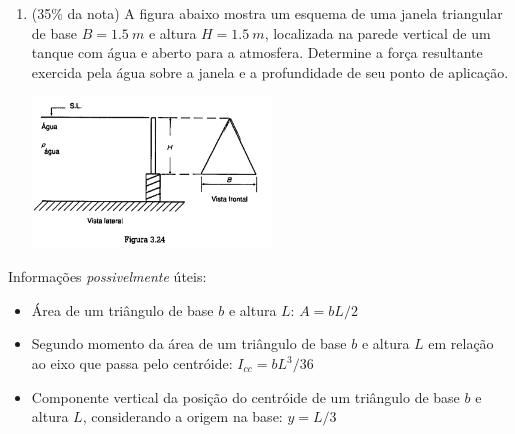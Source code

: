 \documentclass[12pt,a4paper,brazilian, fleqn]{article}
\newcommand{\ratio}[1]{(#1\% da nota)}
\def\Description{Fenômenos de Transporte -- Prova 1}
\begin{document}
\begin{enumerate}
    \item \ratio{35} A figura abaixo mostra um esquema de uma janela triangular de 
        base \(B=\SI{1.5}{m}\) e altura \(H=\SI{1.5}{m}\), localizada na parede 
        vertical de um tanque com água e aberto para a atmosfera. Determine a
        força resultante exercida pela água sobre a janela e a profundidade de seu ponto 
        de aplicação.

        \begin{center}
            \includegraphics[width=0.5\textwidth]{Captura de tela 2025-06-03 134107.png}
        \end{center}
\end{enumerate}

Informações \textit{possivelmente} úteis:
\begin{itemize}
    \item Área de um triângulo de base \(b\) e altura \(L\): \(A=bL/2\)
    \item Segundo momento da área de um triângulo de base \(b\) e altura \(L\) em relação ao eixo que passa pelo centróide:
        \(I_{cc} = bL^3/36\)
    \item Componente vertical da posição do centróide de um triângulo
        de base \(b\) e altura \(L\), considerando a origem na base: \(y=L/3\)
\end{itemize}

\newpage

\def\Description{Fenômenos de Transporte -- Gabarito}
\end{document}
